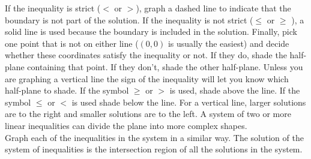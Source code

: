 If the inequality is strict ($<$ or $>$), graph a dashed line to indicate that the boundary is not part of the solution. If the inequality is not strict ($\leq$ or $\geq$ ), a solid line is used because the boundary is included in the solution. Finally, pick one point that is not on either line ($(0,0)$ is usually the easiest) and decide whether these coordinates satisfy the inequality or not. If they do, shade the half-plane containing that point. If they don't, shade the other half-plane. Unless you are graphing a vertical line the sign of the inequality will let you know which half-plane to shade.  If the symbol $\geq$ or $>$ is used, shade above the line. If the symbol $\leq$ or $<$ is used shade below the line. For a vertical line, larger solutions are to the right and smaller solutions are to the left. A system of two or more linear inequalities can divide the plane into more complex shapes. \\

Graph each of the inequalities in the system in a similar way. The solution of the system of inequalities is the intersection region of all the solutions in the system.

